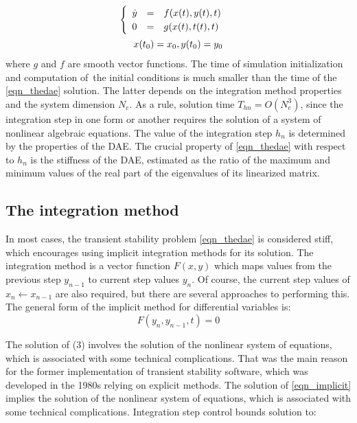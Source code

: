 \documentclass[lettersize,journal]{IEEEtran}
\begin{document}
\begin{equation}
	\label{eqn_thedae}
	\begin{array}{c}
		\begin{cases}
			\begin{array}{lcl}
				\dot{y}&=&f(x(t), y(t), t) \\
			 	      0&=&g(x(t), t(t), t)\\
			\end{array}
		\end{cases} 
	\vspace{0.5em} \\
	 x(t_0)=x_0, y(t_0)=y_0 \\
	\end{array}
\end{equation}
\noindent where \(g\) and \(f\) are smooth vector functions. The time of simulation initialization and computation of the initial conditions is much smaller than the time of the \eqref{eqn_thedae} solution. The latter depends on the integration method properties and the system dimension \(N_e\). As a rule, solution time \(T_{hn}=O(N_e^3)\), since the integration step in one form or another requires the solution of a system of nonlinear algebraic equations. The value of the integration step \(h_n\) is determined by the properties of the DAE. The crucial property of \eqref{eqn_thedae} with respect to \(h_n\) is the stiffness of the DAE, estimated as the ratio of the maximum and minimum values of the real part of the eigenvalues of its linearized matrix. 

\subsection{The integration method}

In most cases, the transient stability problem \eqref{eqn_thedae} is considered stiff, which encourages using implicit integration methods for its solution. The integration method is a vector function \(F(x,y)\) which maps values from the previous step \(y_{n-1}\) to current step values \(y_n\). Of course, the current step values of \(x_{n} \leftarrow x_{n-1}\) are also required, but there are several approaches to performing this. The general form of the implicit method for differential variables is:
\begin{equation}
	\label{eqn_implicit}
	F(y_n,y_{n-1},t)=0
\end{equation}

The solution of (3) involves the solution of the nonlinear system of equations, which is associated with some technical complications. That was the main reason for the former implementation of transient stability software, which was developed in the 1980s relying on explicit methods. The solution of \eqref{eqn_implicit} implies the solution of the nonlinear system of equations, which is associated with some technical complications. Integration step control bounds solution to:
\end{document}
